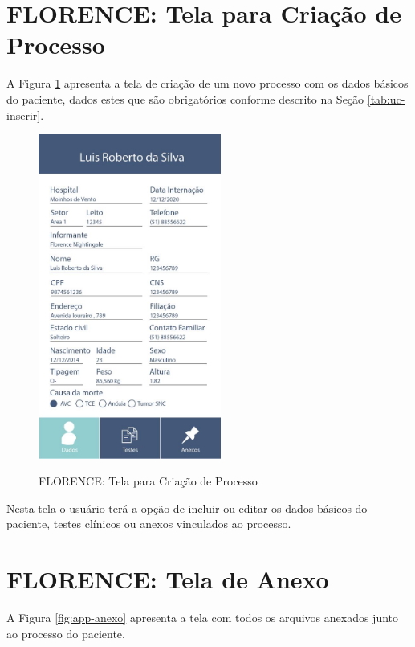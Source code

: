\documentclass[portuguese,oneside]{tcc}
\begin{document}

\section{FLORENCE: Tela para Criação de Processo}
A Figura \ref{fig:app-criacao} apresenta a tela de criação de um novo processo com os dados básicos do paciente, dados estes que são obrigatórios conforme descrito na Seção \ref{tab:uc-inserir}.

\begin{figure}[htp]
\centering
\caption{FLORENCE: Tela para Criação de Processo}
\includegraphics[width=6cm]{app-data}
\label{fig:app-criacao}
\end{figure}

Nesta tela o usuário terá a opção de incluir ou editar os dados básicos do paciente, testes clínicos ou anexos vinculados ao processo.


\section{FLORENCE: Tela de Anexo}
A Figura \ref{fig:app-anexo} apresenta a tela com todos os arquivos anexados junto ao processo do paciente.
\end{document}
